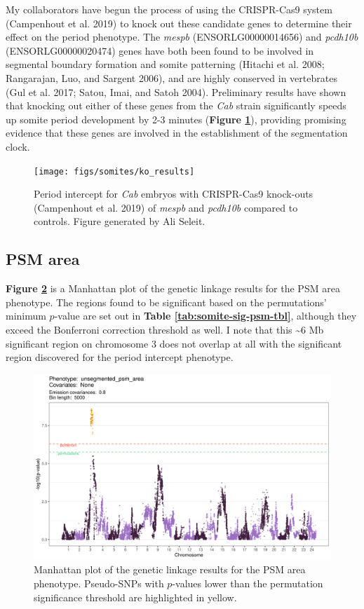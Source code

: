 \documentclass[
]{book}
\begin{document}
My collaborators have begun the process of using the CRISPR-Cas9 system (Campenhout et al. 2019) to knock out these candidate genes to determine their effect on the period phenotype. The \emph{mespb} (ENSORLG00000014656) and \emph{pcdh10b} (ENSORLG00000020474) genes have both been found to be involved in segmental boundary formation and somite patterning (Hitachi et al. 2008; Rangarajan, Luo, and Sargent 2006), and are highly conserved in vertebrates (Gul et al. 2017; Satou, Imai, and Satoh 2004). Preliminary results have shown that knocking out either of these genes from the \emph{Cab} strain significantly speeds up somite period development by 2-3 minutes (\textbf{Figure \ref{fig:ko-period}}), providing promising evidence that these genes are involved in the establishment of the segmentation clock.



\begin{figure}
\texttt{[image: figs/somites/ko\_results]} \caption{Period intercept for \emph{Cab} embryos with CRISPR-Cas9 knock-outs (Campenhout et al. 2019) of \emph{mespb} and \emph{pcdh10b} compared to controls. Figure generated by Ali Seleit.}\label{fig:ko-period}
\end{figure}

\hypertarget{psm-area}{%
\subsection{PSM area}\label{psm-area}}

\textbf{Figure \ref{fig:psm-manhattan}} is a Manhattan plot of the genetic linkage results for the PSM area phenotype. The regions found to be significant based on the permutations' minimum \(p\)-value are set out in \textbf{Table \ref{tab:somite-sig-psm-tbl}}, although they exceed the Bonferroni correction threshold as well. I note that this \textasciitilde6 Mb significant region on chromosome 3 does not overlap at all with the significant region discovered for the period intercept phenotype.



\begin{figure}
\includegraphics[width=1\linewidth]{figs/somites/manhattan_psm_no-covariates} \caption{Manhattan plot of the genetic linkage results for the PSM area phenotype. Pseudo-SNPs with \(p\)-values lower than the permutation significance threshold are highlighted in yellow.}\label{fig:psm-manhattan}
\end{figure}
\end{document}
